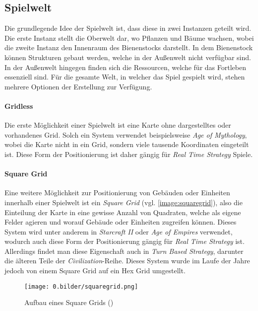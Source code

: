 \subsection{Spielwelt}
Die grundlegende Idee der Spielwelt ist, dass diese in zwei Instanzen geteilt wird. Die erste Instanz stellt die Oberwelt dar, wo Pflanzen und Bäume wachsen, wobei die zweite Instanz den Innenraum des Bienenstocks darstellt. In dem Bienenstock können Strukturen gebaut werden, welche in der Außenwelt nicht verfügbar sind. In der Außenwelt hingegen finden sich die Ressourcen, welche für das Fortleben essenziell sind. Für die gesamte Welt, in welcher das Spiel gespielt wird, stehen mehrere Optionen der Erstellung zur Verfügung.

\paragraph{Gridless}
Die erste Möglichkeit einer Spielwelt ist eine Karte ohne dargestelltes oder vorhandenes Grid. Solch ein System verwendet beispielsweise \textit{Age of Mythology}, wobei die Karte nicht in ein Grid, sondern viele tausende  Koordinaten eingeteilt ist. Diese Form der Positionierung ist daher gängig für \textit{Real Time Strategy} Spiele.

\paragraph{Square Grid}
Eine weitere Möglichkeit zur Positionierung von Gebäuden oder Einheiten innerhalb einer Spielwelt ist ein \textit{Square Grid} (vgl. \autoref{image:squaregrid}), also die Einteilung der Karte in eine gewisse Anzahl von Quadraten, welche als eigene Felder agieren und worauf Gebäude oder Einheiten zugreifen können. Dieses System wird unter anderem in \textit{Starcraft II} oder \textit{Age of Empires} verwendet, wodurch auch diese Form der Positionierung gängig für \textit{Real Time Strategy} ist. Allerdings findet man diese Eigenschaft auch in \textit{Turn Based Strategy}, darunter die älteren Teile der \textit{Civilization}-Reihe. Dieses System wurde im Laufe der Jahre jedoch von einem Square Grid auf ein Hex Grid umgestellt.

\begin{figure}
    \begin{center}
        \texttt{[image: 0.bilder/squaregrid.png]}
    \end{center}
    \caption{Aufbau eines Square Grids (\cite{world:grids})} \label{image:squaregrid}
\end{figure}

